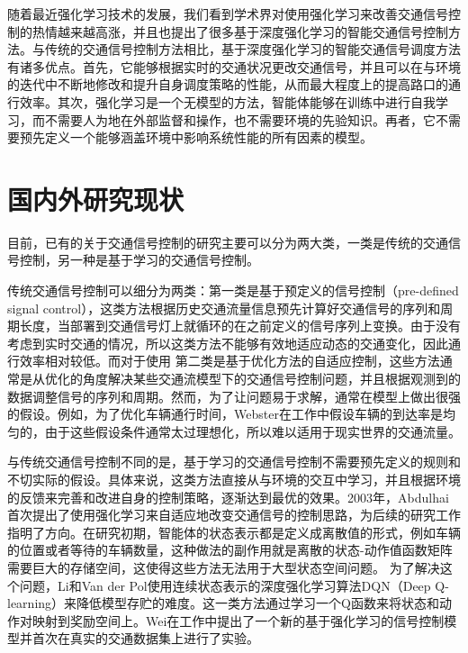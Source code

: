 随着最近强化学习技术的发展，我们看到学术界对使用强化学习来改善交通信号控制的热情越来越高涨，并且也提出了很多基于深度强化学习的智能交通信号控制方法。与传统的交通信号控制方法相比，基于深度强化学习的智能交通信号调度方法有诸多优点。首先，它能够根据实时的交通状况更改交通信号，并且可以在与环境的迭代中不断地修改和提升自身调度策略的性能，从而最大程度上的提高路口的通行效率。其次，强化学习是一个无模型的方法，智能体能够在训练中进行自我学习，而不需要人为地在外部监督和操作，也不需要环境的先验知识。再者，它不需要预先定义一个能够涵盖环境中影响系统性能的所有因素的模型。


\section{国内外研究现状}
目前，已有的关于交通信号控制的研究主要可以分为两大类，一类是传统的交通信号控制，另一种是基于学习的交通信号控制。

传统交通信号控制可以细分为两类：第一类是基于预定义的信号控制（pre-defined signal control）\cite{miller1963settings}，这类方法根据历史交通流量信息预先计算好交通信号的序列和周期长度，当部署到交通信号灯上就循环的在之前定义的信号序列上变换。由于没有考虑到实时交通的情况，所以这类方法不能够有效地适应动态的交通变化，因此通行效率相对较低。而对于使用
第二类是基于优化方法的自适应控制，这些方法通常是从优化的角度解决某些交通流模型下的交通信号控制问题，并且根据观测到的数据调整信号的序列和周期。然而，为了让问题易于求解，通常在模型上做出很强的假设\cite{baang1976optimal,silcock1997designing,haddad2010optimal}。例如，为了优化车辆通行时间，Webster在工作中假设车辆的到达率是均匀的，由于这些假设条件通常太过理想化，所以难以适用于现实世界的交通流量。

与传统交通信号控制不同的是，基于学习的交通信号控制不需要预先定义的规则和不切实际的假设。具体来说，这类方法直接从与环境的交互中学习，并且根据环境的反馈来完善和改进自身的控制策略，逐渐达到最优的效果。2003年，Abdulhai\cite{abdulhai2003reinforcement}首次提出了使用强化学习来自适应地改变交通信号的控制思路，为后续的研究工作指明了方向。在研究初期，智能体的状态表示都是定义成离散值的形式\cite{abdoos2013holonic,abdulhai2003reinforcement,bakker2010traffic,el2013multiagent,wiering2000multi}，例如车辆的位置或者等待的车辆数量，这种做法的副作用就是离散的状态-动作值函数矩阵需要巨大的存储空间，这使得这些方法无法用于大型状态空间问题。
为了解决这个问题，Li\cite{li2016traffic}和Van der Pol\cite{van2016coordinated}使用连续状态表示的深度强化学习算法DQN（Deep Q-learning）来降低模型存贮的难度。这一类方法通过学习一个Q函数来将状态和动作对映射到奖励空间上。Wei在工作中提出了一个新的基于强化学习的信号控制模型并首次在真实的交通数据集上进行了实验。


